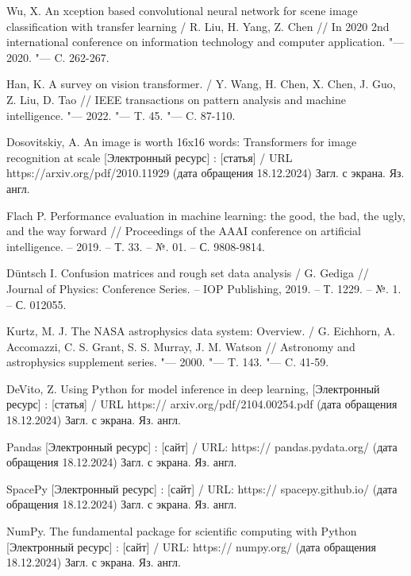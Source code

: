\documentclass[spec, och, diploma]{SCWorks}
\begin{document}
\begin{thebibliography}{99}
     Wu, X. An xception based convolutional neural network for
    scene image classification with transfer learning / R. Liu, H. Yang, Z. Chen
    // In 2020 2nd international conference on information technology and
    computer application. "--- 2020. "--- C. 262-267.

     Han, K. A survey on vision transformer. / Y. Wang, H. Chen, X.
    Chen, J. Guo, Z. Liu, D. Tao // IEEE transactions on pattern analysis and
    machine intelligence. "--- 2022. "--- T. 45. "--- C. 87-110.
    
     Dosovitskiy, A. An image is worth 16x16 words:
    Transformers for image recognition at scale [Электронный ресурс] :
    [статья] / URL https://arxiv.org/pdf/2010.11929 (дата обращения 18.12.2024)
    Загл. с экрана. Яз. англ.


     Flach P. Performance evaluation in machine learning: the
    good, the bad, the ugly, and the way forward // Proceedings of the AAAI
    conference on artificial intelligence. – 2019. – Т. 33. – №. 01. – С.
    9808-9814.

     Düntsch I. Confusion matrices and rough set data analysis / G.
    Gediga // Journal of Physics: Conference Series. – IOP Publishing, 2019. –
    Т. 1229. – №. 1. – С. 012055.

     Kurtz, M. J. The NASA astrophysics data system: Overview. /
    G. Eichhorn, A. Accomazzi, C. S. Grant, S. S. Murray, J. M. Watson //
    Astronomy and astrophysics supplement series. "--- 2000. "--- T. 143. "---
    C. 41-59.


     DeVito, Z. Using Python for model inference in deep
    learning, [Электронный ресурс] : [статья] / URL https://
    arxiv.org/pdf/2104.00254.pdf (дата обращения 18.12.2024) Загл. с экрана. Яз.
    англ.

     Pandas [Электронный ресурс] : [сайт] / URL:
    https:// pandas.pydata.org/ (дата обращения 18.12.2024) Загл. с экрана. Яз.
    англ.

     SpacePy [Электронный ресурс] : [сайт] / URL:
    https:// spacepy.github.io/ (дата обращения 18.12.2024) Загл. с экрана. Яз.
    англ.

     NumPy. The fundamental package for scientific computing
    with Python [Электронный ресурс] : [сайт] / URL: https:// numpy.org/ (дата
    обращения 18.12.2024) Загл. с экрана. Яз. англ.


\end{thebibliography}
\end{document}
